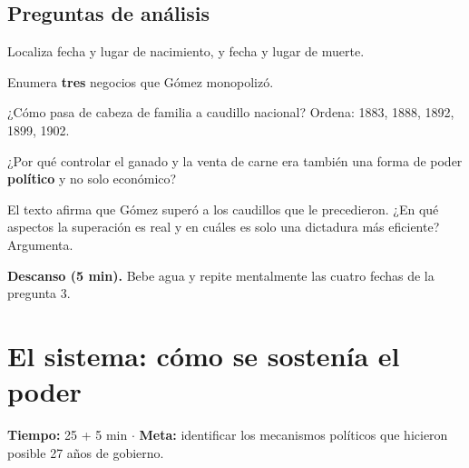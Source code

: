 \documentclass[12pt, letterpaper]{article}
\makeatletter
\let\mw@oldsection\section
\newcommand{\mw@prepage}{%
  \par
  \ifdim\pagegoal=\maxdimen\else
    \ifdim\dimexpr\pagegoal-\pagetotal\relax<7cm\relax
      \newpage
    \fi
  \fi}
\renewcommand{\section}{\mw@prepage\mw@oldsection}
\newcommand{\metasesion}[2]{%
  \begin{cabecerasesion}
    \small
    \textbf{\color{mwprimario}Tiempo:} #1 \quad$\cdot$\quad
    \textbf{\color{mwprimario}Meta:} #2
  \end{cabecerasesion}%
}
\newcommand{\pausa}[1]{%
  \begin{descanso}
    \small\textbf{\color{mwnaranja}Descanso (5 min).} #1
  \end{descanso}%
}
\makeatother
\begin{document}
\subsection*{Preguntas de análisis}
\begin{preguntas}
  \item \facil{} Localiza fecha y lugar de nacimiento, y fecha y lugar de muerte.
  \item \facil{} Enumera \textbf{tres} negocios que Gómez monopolizó.
  \item \medio{} ¿Cómo pasa de \guillemotleft cabeza de familia\guillemotright{} a
        caudillo nacional? Ordena: 1883, 1888, 1892, 1899, 1902.
  \item \dificil{} ¿Por qué controlar el ganado y la venta de carne era también
        una forma de poder \textbf{político} y no solo económico?
  \item \muyDificil{} El texto afirma que Gómez
        \guillemotleft superó a los caudillos que le precedieron\guillemotright.
        ¿En qué aspectos la superación es real y en cuáles es solo una dictadura
        más eficiente? Argumenta.
\end{preguntas}

\pausa{Bebe agua y repite mentalmente las cuatro fechas de la pregunta 3.}

\section{El sistema: cómo se sostenía el poder}

\metasesion{25 + 5 min}{identificar los mecanismos políticos que hicieron
posible 27 años de gobierno.}
\end{document}
